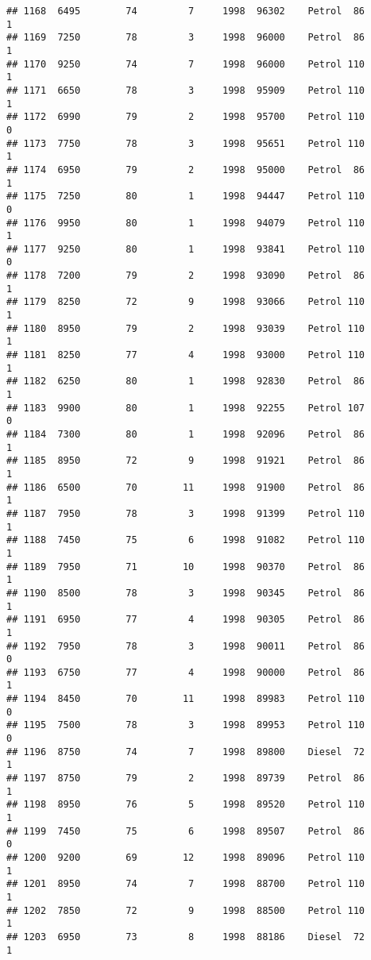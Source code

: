 \documentclass[]{article}
\begin{document}
\begin{verbatim}
## 1168  6495        74         7     1998  96302    Petrol  86         1
## 1169  7250        78         3     1998  96000    Petrol  86         1
## 1170  9250        74         7     1998  96000    Petrol 110         1
## 1171  6650        78         3     1998  95909    Petrol 110         1
## 1172  6990        79         2     1998  95700    Petrol 110         0
## 1173  7750        78         3     1998  95651    Petrol 110         1
## 1174  6950        79         2     1998  95000    Petrol  86         1
## 1175  7250        80         1     1998  94447    Petrol 110         0
## 1176  9950        80         1     1998  94079    Petrol 110         1
## 1177  9250        80         1     1998  93841    Petrol 110         0
## 1178  7200        79         2     1998  93090    Petrol  86         1
## 1179  8250        72         9     1998  93066    Petrol 110         1
## 1180  8950        79         2     1998  93039    Petrol 110         1
## 1181  8250        77         4     1998  93000    Petrol 110         1
## 1182  6250        80         1     1998  92830    Petrol  86         1
## 1183  9900        80         1     1998  92255    Petrol 107         0
## 1184  7300        80         1     1998  92096    Petrol  86         1
## 1185  8950        72         9     1998  91921    Petrol  86         1
## 1186  6500        70        11     1998  91900    Petrol  86         1
## 1187  7950        78         3     1998  91399    Petrol 110         1
## 1188  7450        75         6     1998  91082    Petrol 110         1
## 1189  7950        71        10     1998  90370    Petrol  86         1
## 1190  8500        78         3     1998  90345    Petrol  86         1
## 1191  6950        77         4     1998  90305    Petrol  86         1
## 1192  7950        78         3     1998  90011    Petrol  86         0
## 1193  6750        77         4     1998  90000    Petrol  86         1
## 1194  8450        70        11     1998  89983    Petrol 110         0
## 1195  7500        78         3     1998  89953    Petrol 110         0
## 1196  8750        74         7     1998  89800    Diesel  72         1
## 1197  8750        79         2     1998  89739    Petrol  86         1
## 1198  8950        76         5     1998  89520    Petrol 110         1
## 1199  7450        75         6     1998  89507    Petrol  86         0
## 1200  9200        69        12     1998  89096    Petrol 110         1
## 1201  8950        74         7     1998  88700    Petrol 110         1
## 1202  7850        72         9     1998  88500    Petrol 110         1
## 1203  6950        73         8     1998  88186    Diesel  72         1

\end{verbatim}
\end{document}
